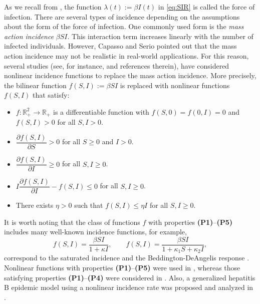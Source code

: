 \documentclass[11pt]{article}
\theoremstyle{definition}
\theoremstyle{remark}
\numberwithin{equation}{section}
\begin{document}
As we recall from \cite{Martcheva}, the function $\lambda(t) := \beta I(t)$ in \eqref{eq:SIR} is called the force of infection. 
There are several types of incidence depending on the assumptions about the form of the force of infection. 
One commonly used form is the \textit{mass action incidence} $\beta SI$. 
This interaction term increases linearly with the number of infected individuals. 
However, Capasso and Serio \cite{Capasso} pointed out that the mass action incidence may not be realistic in real-world applications. 
For this reason, several studies (see, for instance, \cite{ConnellMcCluskey, Sun, Tian, Xu, Zhang} and references therein), have considered nonlinear incidence functions to replace the mass action incidence. 
More precisely, the bilinear function $f(S, I) := \beta SI$ is replaced with nonlinear functions $f(S, I)$ that satisfy:
\begin{itemize}
\item[\textbf{(P1)}] $f\colon\mathbb{R}^2_+ \to \mathbb{R}_+$  is a differentiable function with $f(S, 0) = f(0, I) = 0$ and $f(S, I) > 0$ for all $S, I > 0$.
\item[\textbf{(P2)}] $\dfrac{\partial f(S, I)}{\partial S} > 0$ for all $S \ge0$ and $I > 0$.
\item[\textbf{(P3)}] $\dfrac{\partial f(S, I)}{\partial I} \ge0$ for all $S, I \ge0$.
\item[\textbf{(P4)}] $I\dfrac{\partial f(S, I)}{\partial I} - f(S, I) \le0$ for all $S, I \ge0$.
\item[\textbf{(P5)}] There exists $\eta > 0$ such that $f(S, I) \le\eta I$ for all $S, I \ge0$.
\end{itemize}

It is worth noting that the class of functions $f$ with properties  \textbf{(P1)}--\textbf{(P5)} includes many well-known incidence functions, for example,
\begin{equation*}\label{eq:Nonlinear1}
   f(S, I) = \dfrac{\beta SI}{1 + \kappa I}, \qquad f(S, I) = \dfrac{\beta SI}{1 + \kappa_1 S + \kappa_2 I},
\end{equation*}
correspond to the saturated incidence \cite{Capasso} and the Beddington-DeAngelis response \cite{Beddington, DeAngelis, Zhang}.
%
Nonlinear functions with properties \textbf{(P1)}--\textbf{(P5)} were used in \cite{ConnellMcCluskey, Sun}, whereas those satisfying properties \textbf{(P1)}--\textbf{(P4)} were considered in \cite{Tian}. 
Also, a generalized hepatitis B epidemic model using a nonlinear incidence rate was proposed and analyzed in \cite{Hoang2023}. 
\end{document}
